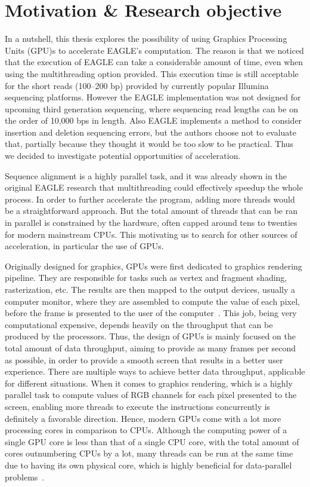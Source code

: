\documentclass{PHlab-thesis}
\begin{document}
\section{Motivation \& Research objective}
In a nutshell, this thesis explores the possibility of using Graphics Processing Units (GPU)s to accelerate EAGLE's computation.
The reason is that we noticed that the execution of EAGLE can take a considerable amount of time, even when using the multithreading option provided.  This execution time is still acceptable for the short reads (100--200 bp) provided by currently popular Illumina sequencing platforms.  However the EAGLE implementation was not
designed for upcoming third generation sequencing, where sequencing read lengths can be on the order of 10,000 bps in length.  Also EAGLE implements a method to consider insertion and deletion sequencing errors, but the authors
choose not to evaluate that, partially because they thought it would be too slow to be practical.
Thus we decided to investigate potential opportunities of acceleration.

Sequence alignment is a highly parallel task, and it was already shown in the original EAGLE research that multithreading could effectively speedup the whole process.  In order to further accelerate the program, adding more threads would be a straightforward approach.  But the total amount of threads that can be ran in parallel is constrained by the hardware, often capped around tens to twenties for modern mainstream CPUs.  This motivating us to search for other sources of acceleration, in particular the use of GPUs.

Originally designed for graphics, GPUs were first dedicated to graphics rendering pipeline.  They are responsible for tasks such as vertex and fragment shading, rasterization, etc.  The results are then mapped to the output devices, usually a computer monitor, where they are assembled to compute the value of each pixel, before the frame is presented to the user of the computer~\cite{foley1994introduction,owens2008gpu}.  This job, being very computational expensive, depends heavily on the throughput that can be produced by the processors.  Thus, the design of GPUs is mainly focused on the total amount of data throughput, aiming to provide as many frames per second as possible, in order to provide a smooth screen that results in a better user experience.  There are multiple ways to achieve better data throughput, applicable for different situations. When it comes to graphics rendering, which is a highly parallel task to compute values of RGB channels for each pixel presented to the screen, enabling more threads to execute the instructions concurrently is definitely a favorable direction. Hence, modern GPUs come with a lot more processing cores in comparison to CPUs. Although the computing power of a single GPU core is less than that of a single CPU core, with the total amount of cores outnumbering CPUs by a lot, many threads can be run at the same time due to having its own physical core, which is highly beneficial for data-parallel problems~\cite{navarro2014survey}.
\end{document}
